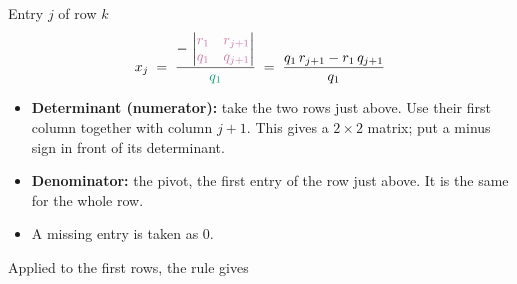 \documentclass[twoside]{article}
\begin{document}
\noindent\begin{minipage}[c]{0.44\linewidth}
\centering
{}
\end{minipage}\hfill
\begin{minipage}[c]{0.52\linewidth}
\begin{rulebox}{Entry $j$ of row $k$}
\[
  x_j \;=\; \frac{-\,\begin{vmatrix} \textcolor{rsel}{r_1} & \textcolor{rsel}{r_{j+1}}\\ \textcolor{rsel}{q_1} & \textcolor{rsel}{q_{j+1}}\end{vmatrix}}{\textcolor{rpiv}{q_1}}
  \;=\; \frac{q_1\,r_{j+1} - r_1\,q_{j+1}}{q_1}
\]
\end{rulebox}
\end{minipage}

\smallskip
\begin{itemize}\itemsep1pt
  \item \textbf{Determinant (numerator):} take the two rows just above. Use their
        \textcolor{rsel}{first column} together with \textcolor{rsel}{column $j+1$}. This gives a
        $2 \times 2$ matrix; put a minus sign in front of its determinant.
  \item \textbf{Denominator:} the \textcolor{rpiv}{pivot}, the first entry of the row just above.
        It is the same for the whole row.
  \item A missing entry is taken as $0$.
\end{itemize}

Applied to the first rows, the rule gives
\end{document}
